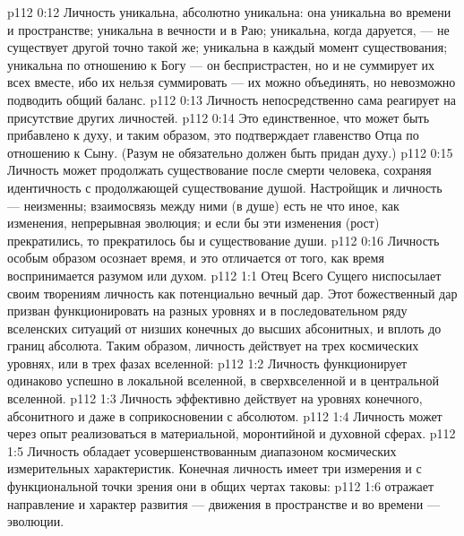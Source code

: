 \vs p112 0:12 \bibnobreakspace Личность уникальна, абсолютно уникальна: она уникальна во времени и пространстве; уникальна в вечности и в Раю; уникальна, когда даруется, --- не существует другой точно такой же; уникальна в каждый момент существования; уникальна по отношению к Богу --- он беспристрастен, но и не суммирует их всех вместе, ибо их нельзя суммировать --- их можно объединять, но невозможно подводить общий баланс.
\vs p112 0:13 \bibnobreakspace Личность непосредственно сама реагирует на присутствие других личностей.
\vs p112 0:14 \bibnobreakspace Это единственное, что может быть прибавлено к духу, и таким образом, это подтверждает главенство Отца по отношению к Сыну. (Разум не обязательно должен быть придан духу.)
\vs p112 0:15 \bibnobreakspace Личность может продолжать существование после смерти человека, сохраняя идентичность с продолжающей существование душой. Настройщик и личность --- неизменны; взаимосвязь между ними (в душе) есть не что иное, как изменения, непрерывная эволюция; и если бы эти изменения (рост) прекратились, то прекратилось бы и существование души.
\vs p112 0:16 \bibnobreakspace Личность особым образом осознает время, и это отличается от того, как время воспринимается разумом или духом.
\vs p112 1:1 Отец Всего Сущего ниспосылает своим творениям личность как потенциально вечный дар. Этот божественный дар призван функционировать на разных уровнях и в последовательном ряду вселенских ситуаций от низших конечных до высших абсонитных, и вплоть до границ абсолюта. Таким образом, личность действует на трех космических уровнях, или в трех фазах вселенной:
\vs p112 1:2 \bibnobreakspace {} Личность функционирует одинаково успешно в локальной вселенной, в сверхвселенной и в центральной вселенной.
\vs p112 1:3 \bibnobreakspace {} Личность эффективно действует на уровнях конечного, абсонитного и даже в соприкосновении с абсолютом.
\vs p112 1:4 \bibnobreakspace {} Личность может через опыт реализоваться в материальной, моронтийной и духовной сферах.
\vs p112 1:5 \pc Личность обладает усовершенствованным диапазоном космических измерительных характеристик. Конечная личность имеет три измерения и с функциональной точки зрения они в общих чертах таковы:
\vs p112 1:6 \bibnobreakspace {} отражает направление и характер развития --- движения в пространстве и во времени --- эволюции.
